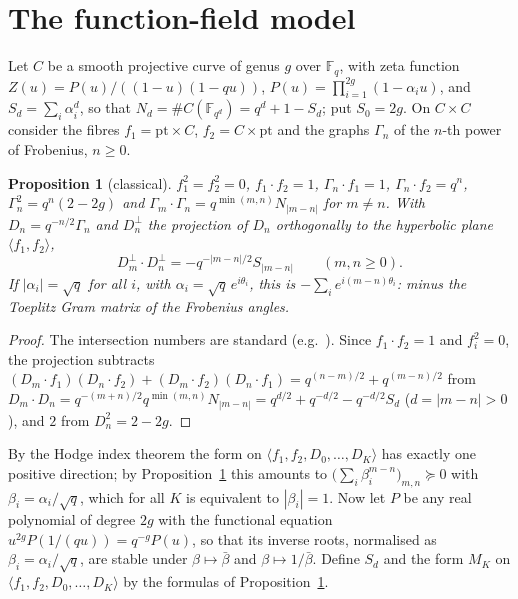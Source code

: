 \documentclass[11pt]{amsart}
\newtheorem{proposition}{Proposition}[section]
\theoremstyle{remark}
\theoremstyle{definition}
\newcommand{\F}{\mathbb F}
\begin{document}
\section{The function-field model}\label{sec:ff}

Let $C$ be a smooth projective curve of genus $g$ over $\F_q$, with zeta function $Z(u)=P(u)/((1-u)(1-qu))$, $P(u)=\prod_{i=1}^{2g}(1-\alpha_iu)$, and $S_d=\sum_i\alpha_i^d$, so that $N_d=\#C(\F_{q^d})=q^d+1-S_d$; put $S_0=2g$. On $C\times C$ consider the fibres $f_1=\mathrm{pt}\times C$, $f_2=C\times\mathrm{pt}$ and the graphs $\Gamma_n$ of the $n$-th power of Frobenius, $n\ge0$.

\begin{proposition}[classical]\label{prop:dict}
$f_1^2=f_2^2=0$, $f_1\cdot f_2=1$, $\Gamma_n\cdot f_1=1$, $\Gamma_n\cdot f_2=q^n$, $\Gamma_n^2=q^n(2-2g)$ and $\Gamma_m\cdot\Gamma_n=q^{\min(m,n)}N_{|m-n|}$ for $m\ne n$. With $D_n=q^{-n/2}\Gamma_n$ and $D_n^\perp$ the projection of $D_n$ orthogonally to the hyperbolic plane $\langle f_1,f_2\rangle$,
\[
D_m^\perp\cdot D_n^\perp=-q^{-|m-n|/2}S_{|m-n|}\qquad(m,n\ge0).
\]
If $|\alpha_i|=\sqrt q$ for all $i$, with $\alpha_i=\sqrt q\,e^{i\theta_i}$, this is $-\sum_ie^{i(m-n)\theta_i}$: minus the Toeplitz Gram matrix of the Frobenius angles.
\end{proposition}
\begin{proof}
The intersection numbers are standard (e.g.\ \cite{Wei48,Bom73}). Since $f_1\cdot f_2=1$ and $f_i^2=0$, the projection subtracts $(D_m\cdot f_1)(D_n\cdot f_2)+(D_m\cdot f_2)(D_n\cdot f_1)=q^{(n-m)/2}+q^{(m-n)/2}$ from $D_m\cdot D_n=q^{-(m+n)/2}q^{\min(m,n)}N_{|m-n|}=q^{d/2}+q^{-d/2}-q^{-d/2}S_d$ ($d=|m-n|>0$), and $2$ from $D_n^2=2-2g$.
\end{proof}

By the Hodge index theorem the form on $\langle f_1,f_2,D_0,\dots,D_K\rangle$ has exactly one positive direction; by Proposition~\ref{prop:dict} this amounts to $\big(\sum_i\beta_i^{m-n}\big)_{m,n}\succeq0$ with $\beta_i=\alpha_i/\sqrt q$, which for all $K$ is equivalent to $|\beta_i|=1$. Now let $P$ be any real polynomial of degree $2g$ with the functional equation $u^{2g}P(1/(qu))=q^{-g}P(u)$, so that its inverse roots, normalised as $\beta_i=\alpha_i/\sqrt q$, are stable under $\beta\mapsto\bar\beta$ and $\beta\mapsto1/\bar\beta$. Define $S_d$ and the form $M_K$ on $\langle f_1,f_2,D_0,\dots,D_K\rangle$ by the formulas of Proposition~\ref{prop:dict}.
\end{document}
